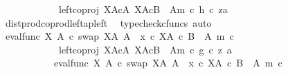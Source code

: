 \begin{isabellebody}
\ \ \ \ \ \ \ \ \ \ \ \ left{\isacharunderscore}{\kern0pt}coproj\ {\isacharparenleft}{\kern0pt}X\isactrlbsup A\isactrlesup {\isasymtimes}\isactrlsub cA{\isacharparenright}{\kern0pt}\ {\isacharparenleft}{\kern0pt}X\isactrlbsup A\isactrlesup {\isasymtimes}\isactrlsub c{\isacharparenleft}{\kern0pt}B\ {\isasymsetminus}\ {\isacharparenleft}{\kern0pt}A{\isacharcomma}{\kern0pt}m{\isacharparenright}{\kern0pt}{\isacharparenright}{\kern0pt}{\isacharparenright}{\kern0pt}\ {\isasymcirc}\isactrlsub c\ {\isasymlangle}h\ {\isasymcirc}\isactrlsub c\ z{\isacharcomma}{\kern0pt}a{\isasymrangle}{\isachardoublequoteclose}\isanewline
\ \ \ \ \ \ \ \ \ \ \ \ \isamarkupfalse%
\ dist{\isacharunderscore}{\kern0pt}prod{\isacharunderscore}{\kern0pt}coprod{\isacharunderscore}{\kern0pt}left{\isacharunderscore}{\kern0pt}ap{\isacharunderscore}{\kern0pt}left\ \isamarkupfalse%
\ {\isacharparenleft}{\kern0pt}typecheck{\isacharunderscore}{\kern0pt}cfuncs{\isacharcomma}{\kern0pt}\ auto{\isacharparenright}{\kern0pt}\isanewline
\ \ \ \ \ \ \ \ \ \ \isamarkupfalse%
\ \isamarkupfalse%
\ {\isachardoublequoteopen}{\isacharparenleft}{\kern0pt}{\isacharparenleft}{\kern0pt}eval{\isacharunderscore}{\kern0pt}func\ X\ A\ {\isasymcirc}\isactrlsub c\ swap\ {\isacharparenleft}{\kern0pt}X\isactrlbsup A\isactrlesup {\isacharparenright}{\kern0pt}\ A{\isacharparenright}{\kern0pt}\ {\isasymamalg}\ {\isacharparenleft}{\kern0pt}x\ {\isasymcirc}\isactrlsub c\ {\isasymbeta}\isactrlbsub X\isactrlbsup A\isactrlesup \ {\isasymtimes}\isactrlsub c\ {\isacharparenleft}{\kern0pt}B\ {\isasymsetminus}\ {\isacharparenleft}{\kern0pt}A{\isacharcomma}{\kern0pt}\ m{\isacharparenright}{\kern0pt}{\isacharparenright}{\kern0pt}\isactrlesub {\isacharparenright}{\kern0pt}\ {\isasymcirc}\isactrlsub c\isanewline
\ \ \ \ \ \ \ \ \ \ \ \ left{\isacharunderscore}{\kern0pt}coproj\ {\isacharparenleft}{\kern0pt}X\isactrlbsup A\isactrlesup {\isasymtimes}\isactrlsub cA{\isacharparenright}{\kern0pt}\ {\isacharparenleft}{\kern0pt}X\isactrlbsup A\isactrlesup {\isasymtimes}\isactrlsub c{\isacharparenleft}{\kern0pt}B\ {\isasymsetminus}\ {\isacharparenleft}{\kern0pt}A{\isacharcomma}{\kern0pt}m{\isacharparenright}{\kern0pt}{\isacharparenright}{\kern0pt}{\isacharparenright}{\kern0pt}{\isacharparenright}{\kern0pt}\ {\isasymcirc}\isactrlsub c\ {\isasymlangle}g\ {\isasymcirc}\isactrlsub c\ z{\isacharcomma}{\kern0pt}\ a{\isasymrangle}\isanewline
\ \ \ \ \ \ \ \ \ \ {\isacharequal}{\kern0pt}\ {\isacharparenleft}{\kern0pt}{\isacharparenleft}{\kern0pt}eval{\isacharunderscore}{\kern0pt}func\ X\ A\ {\isasymcirc}\isactrlsub c\ swap\ {\isacharparenleft}{\kern0pt}X\isactrlbsup A\isactrlesup {\isacharparenright}{\kern0pt}\ A{\isacharparenright}{\kern0pt}\ {\isasymamalg}\ {\isacharparenleft}{\kern0pt}x\ {\isasymcirc}\isactrlsub c\ {\isasymbeta}\isactrlbsub X\isactrlbsup A\isactrlesup \ {\isasymtimes}\isactrlsub c\ {\isacharparenleft}{\kern0pt}B\ {\isasymsetminus}\ {\isacharparenleft}{\kern0pt}A{\isacharcomma}{\kern0pt}\ m{\isacharparenright}{\kern0pt}{\isacharparenright}{\kern0pt}\isactrlesub {\isacharparenright}{\kern0pt}\ {\isasymcirc}\isactrlsub c\isanewline

\end{isabellebody}
